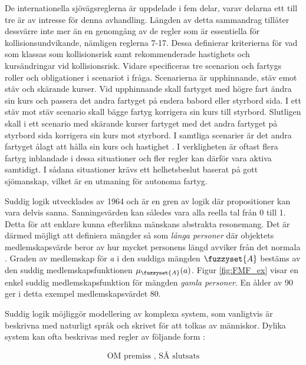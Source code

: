De internationella sjövägsreglerna är uppdelade i fem delar, varav delarna ett till tre är av intresse för denna avhandling. Längden av detta sammandrag tillåter dessvärre inte mer än en genomgång av de regler som är essentiella för kollisionsundvikande, nämligen reglerna 7-17. Dessa definierar kriterierna för vad som klassas som kollisionsrisk samt rekommenderade hastighets och kursändringar vid kollisionsrisk. Vidare specificeras tre scenarion och fartygs roller och obligationer i scenariot i fråga. Scenarierna är upphinnande, stäv emot stäv och skärande kurser. Vid upphinnande skall fartyget med högre fart ändra sin kurs och passera det andra fartyget på endera babord eller styrbord sida. I ett stäv mot stäv scenario skall bägge fartyg korrigera sin kurs till styrbord. Slutligen skall i ett scenario med skärande kurser fartyget med det andra fartyget på styrbord sida korrigera sin kurs mot styrbord. I samtliga scenarier är det andra fartyget ålagt att hålla sin kurs och hastighet \cite{colreg}. I verkligheten är oftast flera fartyg inblandade i dessa situationer och fler regler kan därför vara aktiva samtidigt. I sådana situationer krävs ett helhetsbeslut baserat på gott sjömanskap, vilket är en utmaning för autonoma fartyg.


Suddig logik utvecklades av \textcite{zadeh1996fuzzy} 1964 och är en gren av logik där propositioner kan vara delvis sanna. Sanningsvärden kan således vara alla reella tal från 0 till 1. Detta för att  enklare kunna efterlikna mänskans abstrakta resonemang.  Det är därmed möjligt att definiera mängder så som  \textit{långa personer}  där objektets medlemskapsvärde beror av hur mycket personens längd avviker från det normala \cite{chen2000introduction}.  Graden av medlemskap för \textit{a} i den suddiga mängden $\fuzzyset{A}$ bestäms av den suddig medlemskapsfunktionen $\mu_{\fuzzyset{A}}(a)$.   Figur \ref{fig:FMF_ex} visar en enkel suddig medlemskapsfunktion för mängden \textit{gamla personer}. En ålder av 90 ger i detta exempel medlemskapsvärdet 80.

Suddig logik möjliggör  modellering av komplexa system, som vanligtvis är beskrivna med naturligt språk och skrivet för att tolkas av människor. Dylika system kan ofta beskrivas med regler av följande form :

\begin{equation}
    \text{OM premiss , SÅ slutsats}
\end{equation}



